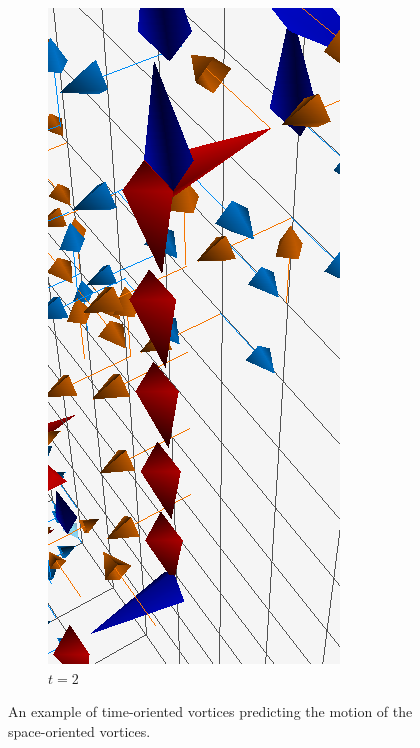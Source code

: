 \begin{figure}[htb!]
\begin{subfigure}[b]{0.45\textwidth}
\includegraphics[height=0.4\textheight]{./plaqlinet2_line&monopole.png}
\caption{\label{fig:VortexMotion2}$t=2$}
\end{subfigure}
\caption{\label{fig:VortexMotion}An example of time-oriented vortices predicting the motion of the space-oriented vortices.}
\end{figure}
%

